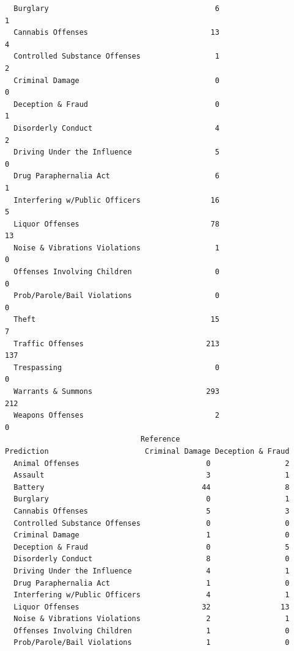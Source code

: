 \documentclass[
  article]{jss}
\begin{document}
\begin{verbatim}
  Burglary                                      6                             1
  Cannabis Offenses                            13                             4
  Controlled Substance Offenses                 1                             2
  Criminal Damage                               0                             0
  Deception & Fraud                             0                             1
  Disorderly Conduct                            4                             2
  Driving Under the Influence                   5                             0
  Drug Paraphernalia Act                        6                             1
  Interfering w/Public Officers                16                             5
  Liquor Offenses                              78                            13
  Noise & Vibrations Violations                 1                             0
  Offenses Involving Children                   0                             0
  Prob/Parole/Bail Violations                   0                             0
  Theft                                        15                             7
  Traffic Offenses                            213                           137
  Trespassing                                   0                             0
  Warrants & Summons                          293                           212
  Weapons Offenses                              2                             0
                               Reference
Prediction                      Criminal Damage Deception & Fraud
  Animal Offenses                             0                 2
  Assault                                     3                 1
  Battery                                    44                 8
  Burglary                                    0                 1
  Cannabis Offenses                           5                 3
  Controlled Substance Offenses               0                 0
  Criminal Damage                             1                 0
  Deception & Fraud                           0                 5
  Disorderly Conduct                          8                 0
  Driving Under the Influence                 4                 1
  Drug Paraphernalia Act                      1                 0
  Interfering w/Public Officers               4                 1
  Liquor Offenses                            32                13
  Noise & Vibrations Violations               2                 1
  Offenses Involving Children                 1                 0
  Prob/Parole/Bail Violations                 1                 0

\end{verbatim}
\end{document}
